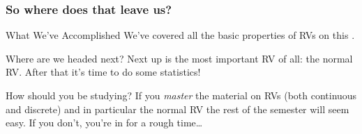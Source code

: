 \begin{frame}
  \frametitle{So where does that leave us?}

  \begin{block}{What We've Accomplished}
    We've covered all the basic properties of RVs on this \href{http://ditraglia.com/Econ103Public/RandomVariablesHandout.pdf}{\textcolor{blue}{}}.
  \end{block}

  \begin{block}{Where are we headed next?}
   Next up is the most important RV of all: the normal RV. 
   After that it's time to do some statistics!
  \end{block}

  \begin{alertblock}{How should you be studying?}
    If you \emph{master} the material on RVs (both continuous and discrete) and in particular the normal RV the rest of the semester will seem easy. 
    If you don't, you're in for a rough time\dots
  \end{alertblock}


\end{frame}
